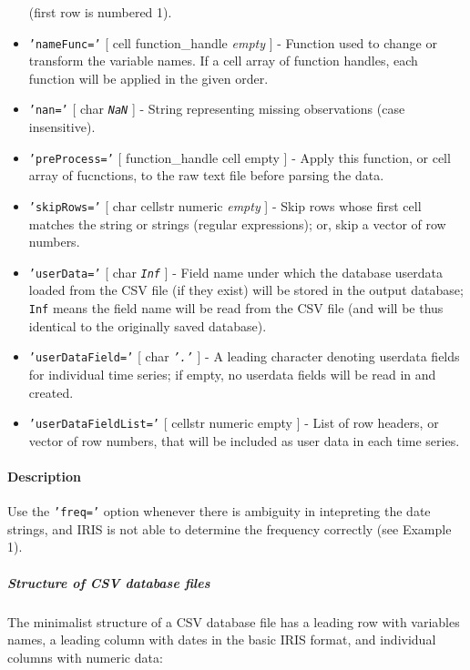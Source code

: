 \begin{itemize}
   (first row is numbered 1).
 \item
   \texttt{'nameFunc='} {[} cell \textbar{} function\_handle \textbar{}
   \emph{empty} {]} - Function used to change or transform the variable
   names. If a cell array of function handles, each function will be
   applied in the given order.
 \item
   \texttt{'nan='} {[} char \textbar{} \emph{\texttt{NaN}} {]} - String
   representing missing observations (case insensitive).
 \item
   \texttt{'preProcess='} {[} function\_handle \textbar{} cell \textbar{}
   empty {]} - Apply this function, or cell array of fucnctions, to the
   raw text file before parsing the data.
 \item
   \texttt{'skipRows='} {[} char \textbar{} cellstr \textbar{} numeric
   \textbar{} \emph{empty} {]} - Skip rows whose first cell matches the
   string or strings (regular expressions); or, skip a vector of row
   numbers.
 \item
   \texttt{'userData='} {[} char \textbar{} \emph{\texttt{Inf}} {]} -
   Field name under which the database userdata loaded from the CSV file
   (if they exist) will be stored in the output database; \texttt{Inf}
   means the field name will be read from the CSV file (and will be thus
   identical to the originally saved database).
 \item
   \texttt{'userDataField='} {[} char \textbar{} \emph{\texttt{'.'}} {]}
   - A leading character denoting userdata fields for individual time
   series; if empty, no userdata fields will be read in and created.
 \item
   \texttt{'userDataFieldList='} {[} cellstr \textbar{} numeric
   \textbar{} empty {]} - List of row headers, or vector of row numbers,
   that will be included as user data in each time series.
 \end{itemize}
 
 \paragraph{Description}
 
 Use the \texttt{'freq='} option whenever there is ambiguity in
 intepreting the date strings, and IRIS is not able to determine the
 frequency correctly (see Example 1).
 
 \subparagraph{Structure of CSV database files}
 
 The minimalist structure of a CSV database file has a leading row with
 variables names, a leading column with dates in the basic IRIS format,
 and individual columns with numeric data:
 
